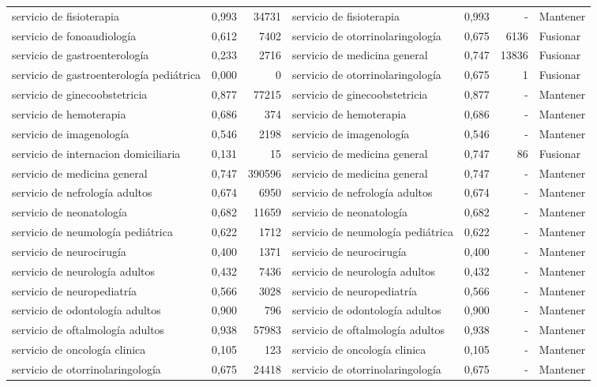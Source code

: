 \begin{table}[htb]
{\begin{tabular}{@{}lrrlrrl@{}}
servicio de fisioterapia & 0,993 & 34731 & servicio de fisioterapia & 0,993 & - & Mantener \\
servicio de fonoaudiología & 0,612 & 7402 & servicio de otorrinolaringología & 0,675 & 6136 & Fusionar \\
servicio de gastroenterología & 0,233 & 2716 & servicio de medicina general & 0,747 & 13836 & Fusionar \\
servicio de gastroenterología pediátrica & 0,000 & 0 & servicio de otorrinolaringología & 0,675 & 1 & Fusionar \\
servicio de ginecoobstetricia & 0,877 & 77215 & servicio de ginecoobstetricia & 0,877 & - & Mantener \\
servicio de hemoterapia & 0,686 & 374 & servicio de hemoterapia & 0,686 & - & Mantener \\
servicio de imagenología & 0,546 & 2198 & servicio de imagenología & 0,546 & - & Mantener \\
servicio de internacion domiciliaria & 0,131 & 15 & servicio de medicina general & 0,747 & 86 & Fusionar \\
servicio de medicina general & 0,747 & 390596 & servicio de medicina general & 0,747 & - & Mantener \\
servicio de nefrología adultos & 0,674 & 6950 & servicio de nefrología adultos & 0,674 & - & Mantener \\
servicio de neonatología & 0,682 & 11659 & servicio de neonatología & 0,682 & - & Mantener \\
servicio de neumología pediátrica & 0,622 & 1712 & servicio de neumología pediátrica & 0,622 & - & Mantener \\
servicio de neurocirugía & 0,400 & 1371 & servicio de neurocirugía & 0,400 & - & Mantener \\
servicio de neurología adultos & 0,432 & 7436 & servicio de neurología adultos & 0,432 & - & Mantener \\
servicio de neuropediatría & 0,566 & 3028 & servicio de neuropediatría & 0,566 & - & Mantener \\
servicio de odontología adultos & 0,900 & 796 & servicio de odontología adultos & 0,900 & - & Mantener \\
servicio de oftalmología adultos & 0,938 & 57983 & servicio de oftalmología adultos & 0,938 & - & Mantener \\
servicio de oncología clinica & 0,105 & 123 & servicio de oncología clinica & 0,105 & - & Mantener \\
servicio de otorrinolaringología & 0,675 & 24418 & servicio de otorrinolaringología & 0,675 & - & Mantener \\

\end{tabular}}
\end{table}
